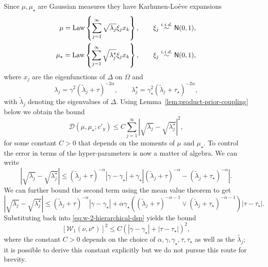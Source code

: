 \documentclass[final]{siamart171218}
\newcommand{\K}{\mathcal{D}}
\newcommand{\W}{\mathcal{W}}
\newcommand{\N}{\mathsf{N}}
\newcommand{\Law}{{\rm Law}}
\newcommand{\iidsim}{\stackrel{i.i.d.}{\sim}}
\begin{document}
Since $\mu, \mu_\star$ are Gaussian measures they have Karhunen-Lo\'eve 
expansions 
\begin{equation*}
    \begin{aligned}
      \mu = \Law\left\{ \sum_{j=1}^\infty \sqrt{\lambda_j} \xi_j x_k  \right\}, 
      \qquad \xi_j \iidsim \N(0,1), \\ 
      \mu_\star = \Law\left\{ \sum_{j=1}^\infty \sqrt{\lambda^\star_j} \xi_j x_k  \right\}, 
      \qquad \xi_j \iidsim \N(0,1),
    \end{aligned}
\end{equation*}
where $x_j$ are the eigenfunctions of $\Delta$ on $\Omega$ and
\begin{equation*}
    \lambda_j = \gamma^2 \left( \tilde{\lambda}_j + \tau \right)^{-2\alpha}, \qquad 
        \lambda^\star_j = \gamma_\star^2 \left( \tilde{\lambda}_j + \tau_\star \right)^{-2\alpha},
\end{equation*}
with $\tilde{\lambda}_j$ denoting the eigenvalues of $\Delta$. 
Using Lemma~\ref{lem:product-prior-coupling} below we obtain the bound 
\begin{equation}\label{eq:w-2-hierarchical-dsp}
    \K(\mu, \mu_\star; c'_y) \le C  \sum_{j=1}^\infty \left| \sqrt{\lambda_j} 
    - \sqrt{\lambda_j^\star} \right|^2,
\end{equation}
for some constant $C> 0$ that depends on the moments of $\mu$ and $\mu_\star$. 
To control the error in terms of the hyper-parameters is now a matter of algebra. 
We can write 
\begin{equation*}
    \left| \sqrt{\lambda_j} - \sqrt{\lambda_j^\star}\right|
    \le  ( \tilde \lambda_j + \tau)^{-\alpha} | \gamma - \gamma_\star| 
    + \gamma_\star \left| \left( \tilde{\lambda}_j + \tau \right)^{-\alpha} 
    - \left( \tilde{\lambda}_j + \tau_\star \right)^{-\alpha}
    \right|.
\end{equation*}
We can further bound the second term using the mean value theorem to get 
\begin{equation*}
    \left| \sqrt{\lambda_j} - \sqrt{\lambda_j^\star}\right|
    \le  ( \tilde \lambda_j + \tau)^{-\alpha} | \gamma - \gamma_\star| 
    + \alpha \gamma_\star  \left( (\tilde\lambda_j  + \tau)^{- \alpha - 1} \vee 
    (\tilde\lambda_j + \tau_\star)^{- \alpha - 1}  \right)  | \tau - \tau_\star|.
\end{equation*}
Substituting back into \eqref{eq:w-2-hierarchical-dsp} yields the bound 
\begin{equation*}
   \left[  \W_1(\nu, \nu^\star) \right]^2 \le C \left( |\gamma - \gamma_\star| 
   + |\tau - \tau_\star|   \right)^2, 
\end{equation*}
where the constant $C> 0$ depends on the choice of $\alpha, \gamma, \gamma_\star, \tau, \tau_\star$ as well as the $\tilde{\lambda_j}$; it is possible to derive this constant 
explicitly but we do not pursue this route for brevity.
\end{document}
